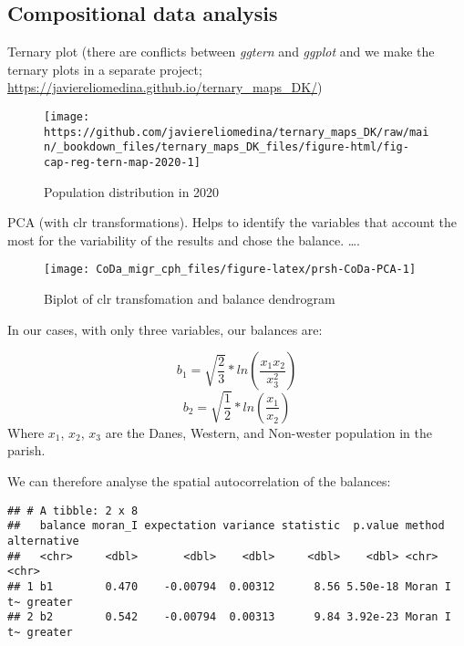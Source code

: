 \documentclass[
  12pt,
]{article}
\begin{document}
\hypertarget{compositional-data-analysis}{%
\subsection{Compositional data analysis}\label{compositional-data-analysis}}

Ternary plot (there are conflicts between \emph{ggtern} and \emph{ggplot} and we make the ternary plots in a separate project; \url{https://javiereliomedina.github.io/ternary_maps_DK/})

\begin{figure}[H]

{\centering \texttt{[image: https://github.com/javiereliomedina/ternary\_maps\_DK/raw/main/\_bookdown\_files/ternary\_maps\_DK\_files/figure-html/fig-cap-reg-tern-map-2020-1]} 

}

\caption{Population distribution in 2020}\label{fig:fig-tern-pop}
\end{figure}

PCA (with clr transformations). Helps to identify the variables that account the most for the variability of the results and chose the balance. \ldots.

\begin{figure}[H]

{\centering \texttt{[image: CoDa\_migr\_cph\_files/figure-latex/prsh-CoDa-PCA-1]} 

}

\caption{Biplot of clr transfomation and balance dendrogram}\label{fig:prsh-CoDa-PCA}
\end{figure}

In our cases, with only three variables, our balances are:

\[ b_1 = \sqrt{\frac{2}{3}} * ln(\frac{x_1 x_2}{x_3^2}) \]
\[ b_2 = \sqrt{\frac{1}{2}} * ln(\frac{x_1}{x_2}) \]
Where \(x_1\), \(x_2\), \(x_3\) are the Danes, Western, and Non-wester population in the parish.

We can therefore analyse the spatial autocorrelation of the balances:

\begin{verbatim}
## # A tibble: 2 x 8
##   balance moran_I expectation variance statistic  p.value method     alternative
##   <chr>     <dbl>       <dbl>    <dbl>     <dbl>    <dbl> <chr>      <chr>      
## 1 b1        0.470    -0.00794  0.00312      8.56 5.50e-18 Moran I t~ greater    
## 2 b2        0.542    -0.00794  0.00313      9.84 3.92e-23 Moran I t~ greater
\end{verbatim}
\end{document}
